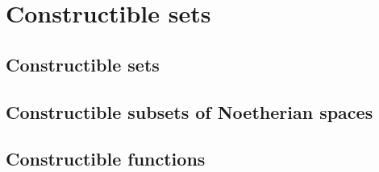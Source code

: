 \section{Constructible sets}
\label{section-constructible sets}

\subsection{Constructible sets}
\label{subsection-constructible sets}

\subsection{Constructible subsets of Noetherian spaces}
\label{subsection-constructible-subsets-of-noetherian-spaces}

\subsection{Constructible functions}
\label{subsection-constructible-functions}

